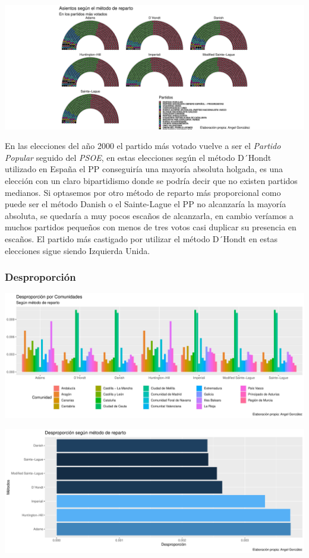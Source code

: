 \documentclass[12pt,a4paper,]{book}
\numberwithin{dummy}{section}
\theoremstyle{ocrenumbox}
\theoremstyle{blacknumex}
\theoremstyle{blacknumbox}
\theoremstyle{ocrenum}
\theoremstyle{ocrenum}
\begin{document}
\begin{center}\includegraphics[width=0.95\linewidth]{figurasR/unnamed-chunk-122-3} \end{center}

En las elecciones del año 2000 el partido más votado vuelve a ser el
\emph{Partido Popular} seguido del \emph{PSOE}, en estas elecciones
según el método D´Hondt utilizado en España el PP conseguiría una
mayoría absoluta holgada, es una elección con un claro bipartidismo
donde se podría decir que no existen partidos medianos. Si optasemos por
otro método de reparto más proporcional como puede ser el método Danish
o el Sainte-Lague el PP no alcanzaría la mayoría absoluta, se quedaría a
muy pocos escaños de alcanzarla, en cambio veríamos a muchos partidos
pequeños con menos de tres votos casi duplicar su presencia en escaños.
El partido más castigado por utilizar el método D´Hondt en estas
elecciones sigue siendo Izquierda Unida.

\hypertarget{desproporciuxf3n-7}{%
\subsubsection{Desproporción}\label{desproporciuxf3n-7}}

\begin{center}\includegraphics[width=0.95\linewidth]{figurasR/unnamed-chunk-123-1} \end{center}

\begin{center}\includegraphics[width=0.95\linewidth]{figurasR/unnamed-chunk-123-2} \end{center}
\end{document}
